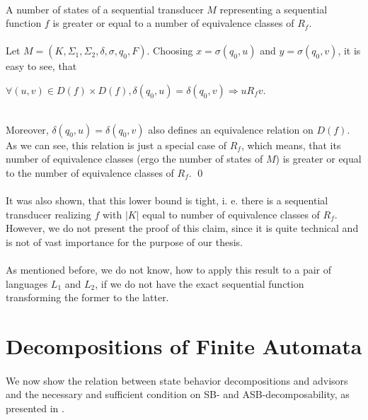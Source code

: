 \paragraph{}
\cveta A number of states of a sequential transducer $M$ representing a sequential function $f$ is greater or equal to a number of equivalence classes of $R_{f}$.

\paragraph{}
\dokaz Let $M=(K, \Sigma_{1}, \Sigma_{2}, \delta, \sigma, q_{0}, F)$. Choosing $x = \sigma (q_{0}, u)$ and $y = \sigma (q_{0}, v)$, it is easy to see, that\\
\centerline{$\forall (u,v) \in D(f) \times D(f), \delta (q_{0}, u) = \delta (q_{0}, v) \Rightarrow u R_{f} v$.}\\
Moreover, $\delta (q_{0}, u) = \delta (q_{0}, v)$ also defines an equivalence relation on $D(f)$. As we can see, this relation is just a special case of $R_{f}$, which means, that its number of equivalence classes (ergo the number of states of $M$) is greater or equal to the number of equivalence classes of $R_{f}$. \qed

\paragraph{}
It was also shown, that this lower bound is tight, i. e. there is a sequential transducer realizing $f$ with $|K|$ equal to number of equivalence classes of $R_{f}$. However, we do not present the proof of this claim, since it is quite technical and is not of vast importance for the purpose of our thesis.

\paragraph{}
As mentioned before, we do not know, how to apply this result to a pair of languages $L_{1}$ and $L_{2}$, if we do not have the exact sequential function transforming the former to the latter.

\section{Decompositions of Finite Automata}

\paragraph{}
We now show the relation between state behavior decompositions and advisors and the necessary and sufficient condition on SB- and ASB-decomposability, as presented in \cite{Gazi}.

